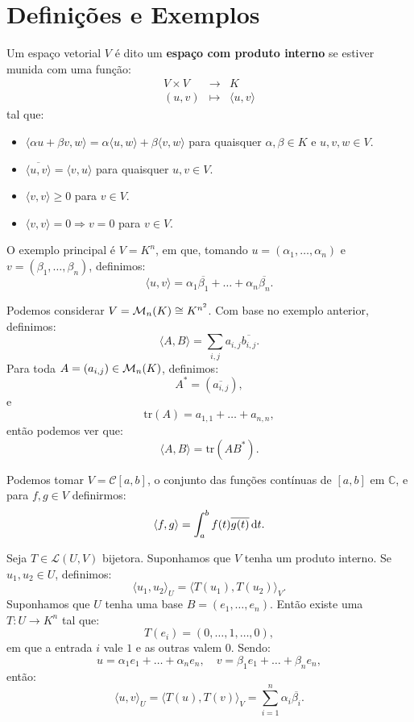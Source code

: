 \documentclass[11pt,twoside,a4paper]{book}
\begin{document}
\section{Definições e Exemplos}

\begin{definicao}
Um espaço vetorial $V$ é dito um \textbf{espaço com produto interno} se estiver munida com uma função:
\[
\begin{array}{rcl}
V\times V&\rightarrow&K\\
(u,v)&\mapsto&\langle u,v\rangle
\end{array}
\]
tal que:
\begin{itemize}
\item $\langle\alpha u+\beta v,w\rangle=\alpha\langle u,w\rangle+\beta\langle v,w\rangle$ para quaisquer $\alpha,\beta\in K$ e $u,v,w\in V$.
\item $\overline{\langle u,v\rangle}=\langle v,u\rangle$ para quaisquer $u,v\in V$.
\item $\langle v,v\rangle\geq 0$ para $v\in V$.
\item $\langle v,v\rangle=0\Rightarrow v=0$ para $v\in V$.
\end{itemize}
\end{definicao}

\begin{exemplo}
O exemplo principal é $V=K^n$, em que, tomando $u=(\alpha_1,\dots,\alpha_n)$ e $v=(\beta_1,\dots,\beta_n)$, definimos:
\[
\langle u,v\rangle=\alpha_1\overline{\beta_1}+\dots+\alpha_n\overline{\beta_n}.
\]
\end{exemplo}

\begin{exemplo}
Podemos considerar $V=\mathcal{M}_{n}(K)\cong K^{n^2}$. Com base no exemplo anterior, definimos:
\[
\langle A,B\rangle=\sum_{i,j}a_{i,j}\overline{b_{i,j}}.
\]
Para toda $A=(a_{i,j})\in\mathcal{M}_{n}(K)$, definimos:
\[
A^*=(\overline{a_{i,j}}),
\]
e
\[
\mathrm{tr}(A)=a_{1,1}+\dots+a_{n,n},
\]
então podemos ver que:
\[
\langle A,B\rangle=\mathrm{tr}(AB^*).
\]
\end{exemplo}

\begin{exemplo}
Podemos tomar $V=\mathcal{C}[a,b]$, o conjunto das funções contínuas de $[a,b]$ em $\mathbb{C}$, e para $f,g\in V$ definirmos:
\[
\langle f,g\rangle=\int_a^bf(t)\overline{g(t)}\dif t.
\]
\end{exemplo}

\begin{exemplo}
Seja $T\in\mathcal{L}(U,V)$ bijetora. Suponhamos que $V$ tenha um produto interno. Se $u_1,u_2\in U$, definimos:
\[
\langle u_1,u_2\rangle_U=\langle T(u_1),T(u_2)\rangle_V.
\]
Suponhamos que $U$ tenha uma base $B=(e_1,\dots,e_n)$. Então existe uma $T:U\rightarrow K^n$ tal que:
\[
T(e_i)=(0,\dots,1,\dots,0),
\]
em que a entrada $i$ vale $1$ e as outras valem $0$. Sendo:
\[
u=\alpha_1e_1+\dots+\alpha_ne_n,\quad v=\beta_1e_1+\dots+\beta_ne_n,
\]
então:
\[
\langle u,v\rangle_U=\langle T(u),T(v)\rangle_V=\sum_{i=1}^n\alpha_i\overline{\beta_i}.
\]
\end{exemplo}
\end{document}
